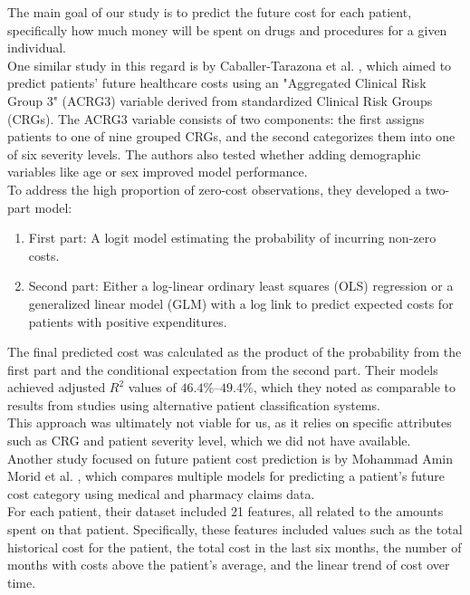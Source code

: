 
The main goal of our study is to predict the future cost for each patient, specifically how much money will be spent on drugs and procedures for a given individual.
\\
 
One similar study in this regard is by Caballer-Tarazona et al. \cite{caballer2019predicting}, which aimed to predict patients’ future healthcare costs using an "Aggregated Clinical Risk Group 3" (ACRG3) variable derived from standardized Clinical Risk Groups (CRGs). The ACRG3 variable consists of two components: the first assigns patients to one of nine grouped CRGs, and the second categorizes them into one of six severity levels. The authors also tested whether adding demographic variables like age or sex improved model performance.
\\

To address the high proportion of zero-cost observations, they developed a two-part model:

\begin{enumerate}
	\item First part: A logit model estimating the probability of incurring non-zero costs.
	\item Second part: Either a log-linear ordinary least squares (OLS) regression or a generalized linear model (GLM) with a log link to predict expected costs for patients with positive expenditures.
\end{enumerate}

The final predicted cost was calculated as the product of the probability from the first part and the conditional expectation from the second part. Their models achieved adjusted $R^2$ values of $46.4\%$–$49.4\%$, which they noted as comparable to results from studies using alternative patient classification systems.
\\

This approach was ultimately not viable for us, as it relies on specific attributes such as CRG and patient severity level, which we did not have available.
\\

Another study focused on future patient cost prediction is by Mohammad Amin Morid et al. \cite{morid2018supervised}, which compares multiple models for predicting a patient’s future cost category using medical and pharmacy claims data.
\\

For each patient, their dataset included 21 features, all related to the amounts spent on that patient. Specifically, these features included values such as the total historical cost for the patient, the total cost in the last six months, the number of months with costs above the patient’s average, and the linear trend of cost over time.
\\

